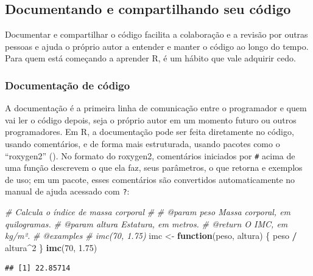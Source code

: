 \documentclass[
]{book}
\newenvironment{Shaded}{\begin{snugshade}}{\end{snugshade}}
\newcommand{\CommentTok}[1]{\textcolor[rgb]{0.56,0.35,0.01}{\textit{#1}}}
\newcommand{\ControlFlowTok}[1]{\textcolor[rgb]{0.13,0.29,0.53}{\textbf{#1}}}
\newcommand{\DecValTok}[1]{\textcolor[rgb]{0.00,0.00,0.81}{#1}}
\newcommand{\FloatTok}[1]{\textcolor[rgb]{0.00,0.00,0.81}{#1}}
\newcommand{\FunctionTok}[1]{\textcolor[rgb]{0.13,0.29,0.53}{\textbf{#1}}}
\newcommand{\NormalTok}[1]{#1}
\newcommand{\OtherTok}[1]{\textcolor[rgb]{0.56,0.35,0.01}{#1}}
\newcommand{\SpecialCharTok}[1]{\textcolor[rgb]{0.81,0.36,0.00}{\textbf{#1}}}
\begin{document}
\subsection{Documentando e compartilhando seu código}\label{documentando-e-compartilhando-seu-cuxf3digo}

Documentar e compartilhar o código facilita a colaboração e a revisão por outras pessoas e ajuda o próprio autor a entender e manter o código ao longo do tempo. Para quem está começando a aprender R, é um hábito que vale adquirir cedo.

\subsubsection{Documentação de código}\label{documentauxe7uxe3o-de-cuxf3digo}

A documentação é a primeira linha de comunicação entre o programador e quem vai ler o código depois, seja o próprio autor em um momento futuro ou outros programadores. Em R, a documentação pode ser feita diretamente no código, usando comentários, e de forma mais estruturada, usando pacotes como o ``roxygen2'' (). No formato do roxygen2, comentários iniciados por \texttt{\#\textquotesingle{}} acima de uma função descrevem o que ela faz, seus parâmetros, o que retorna e exemplos de uso; em um pacote, esses comentários são convertidos automaticamente no manual de ajuda acessado com \texttt{?}:

\begin{Shaded}
\begin{Highlighting}[]
\CommentTok{\#\textquotesingle{} Calcula o índice de massa corporal}
\CommentTok{\#\textquotesingle{}}
\CommentTok{\#\textquotesingle{} @param peso Massa corporal, em quilogramas.}
\CommentTok{\#\textquotesingle{} @param altura Estatura, em metros.}
\CommentTok{\#\textquotesingle{} @return O IMC, em kg/m².}
\CommentTok{\#\textquotesingle{} @examples}
\CommentTok{\#\textquotesingle{} imc(70, 1.75)}
\NormalTok{imc }\OtherTok{\textless{}{-}} \ControlFlowTok{function}\NormalTok{(peso, altura) \{}
\NormalTok{  peso }\SpecialCharTok{/}\NormalTok{ altura}\SpecialCharTok{\^{}}\DecValTok{2}
\NormalTok{\}}
\FunctionTok{imc}\NormalTok{(}\DecValTok{70}\NormalTok{, }\FloatTok{1.75}\NormalTok{)}
\end{Highlighting}
\end{Shaded}

\begin{verbatim}
## [1] 22.85714
\end{verbatim}
\end{document}
